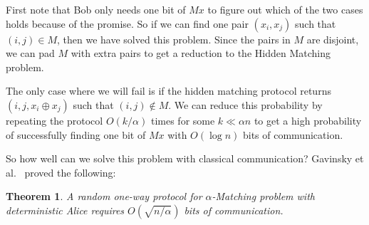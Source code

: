 \documentclass[a4paper]{article}
\newtheorem{theorem}{Theorem}[section]
\begin{document}
        First note that Bob only needs one bit of $Mx$ to figure out which of the two cases holds because of the promise. So if we can find one pair $(x_i, x_j)$ such that $(i, j) \in M$, then we have solved this problem. Since the pairs in $M$ are disjoint, we can pad $M$ with extra pairs to get a reduction to the Hidden Matching problem.

        The only case where we will fail is if the hidden matching protocol returns $(i, j, x_i \oplus x_j)$ such that $(i, j) \notin M$. We can reduce this probability by repeating the protocol $O(k/\alpha)$ times for some $k \ll \alpha n$ to get a high probability of successfully finding one bit of $Mx$ with $O(\log n)$ bits of communication.

        So how well can we solve this problem with classical communication? Gavinsky et al.~\cite{Gavinsky:2007:ESO:1250790.1250866} proved the following:

        \begin{theorem}
            A random one-way protocol for $\alpha$-Matching problem with deterministic Alice requires $O(\sqrt{n/\alpha})$ bits of communication.
        \end{theorem}
\end{document}
